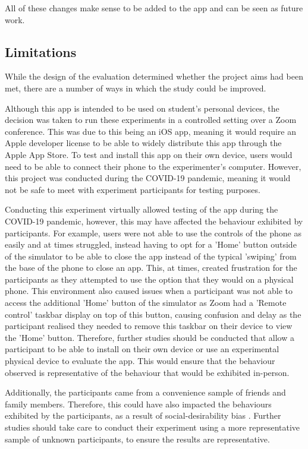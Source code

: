 \documentclass{l4proj}
\begin{document}
All of these changes make sense to be added to the app and can be seen as future work.

\subsection{Limitations}

While the design of the evaluation determined whether the project aims had been met, there are a number of ways in which the study could be improved.

Although this app is intended to be used on student's personal devices, the decision was taken to run these experiments in a controlled setting over a Zoom conference. This was due to this being an iOS app, meaning it would require an Apple developer license to be able to widely distribute this app through the Apple App Store. To test and install this app on their own device, users would need to be able to connect their phone to the experimenter's computer. However, this project was conducted during the COVID-19 pandemic, meaning it would not be safe to meet with experiment participants for testing purposes. 

Conducting this experiment virtually allowed testing of the app during the COVID-19 pandemic, however, this may have affected the behaviour exhibited by participants. For example, users were not able to use the controls of the phone as easily and at times struggled, instead having to opt for a 'Home' button outside of the simulator to be able to close the app instead of the typical 'swiping' from the base of the phone to close an app. This, at times, created frustration for the participants as they attempted to use the option that they would on a physical phone. This environment also caused issues when a participant was not able to access the additional 'Home' button of the simulator as Zoom had a 'Remote control' taskbar display on top of this button, causing confusion and delay as the participant realised they needed to remove this taskbar on their device to view the 'Home' button. Therefore, further studies should be conducted that allow a participant to be able to install on their own device or use an experimental physical device to evaluate the app. This would ensure that the behaviour observed is representative of the behaviour that would be exhibited in-person.

Additionally, the participants came from a convenience sample of friends and family members. Therefore, this could have also impacted the behaviours exhibited by the participants, as a result of social-desirability bias \citep{lavrakas_social_2008}. Further studies should take care to conduct their experiment using a more representative sample of unknown participants, to ensure the results are representative.
\end{document}
